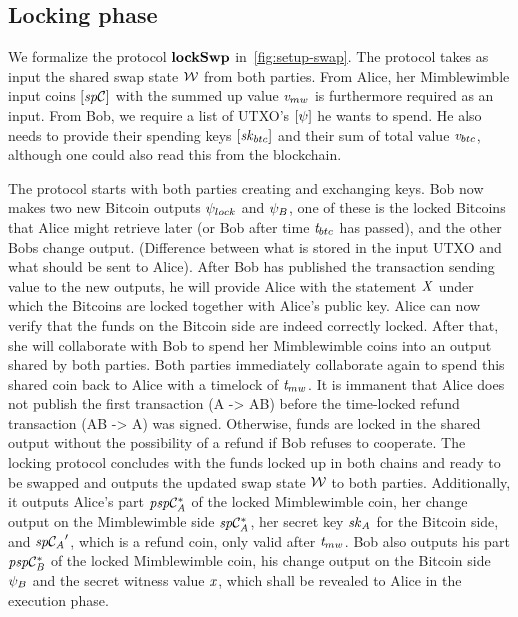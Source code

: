 \subsection{Locking phase}\label{subsec:atom:locking}

We formalize the protocol $\mathbf{lockSwp}$ in~\cref{fig:setup-swap}.
The protocol takes as input the shared swap state $\mathcal{W}$ from both parties.
From Alice, her Mimblewimble input coins $[\mathit{sp}\mathcal{C}]$ with the summed up value $\mathit{v}_{mw}$ is furthermore required as an input.
From Bob, we require a list of UTXO's $[\psi]$ he wants to spend.
He also needs to provide their spending keys $[\mathit{sk}_{btc}]$ and their sum of total value $\mathit{v}_{btc}$, although one could also read this from the blockchain.

The protocol starts with both parties creating and exchanging keys.
Bob now makes two new Bitcoin outputs $\psi_{lock}$ and $\psi_{B}$, one of these is the locked Bitcoins that Alice might retrieve later (or Bob after time $\mathit{t}_{btc}$ has passed), and the other Bobs change output. (Difference between what is stored in the input UTXO and what should be sent to Alice).
After Bob has published the transaction sending value to the new outputs, he will provide Alice with the statement $\mathit{X}$ under which the Bitcoins are locked together with Alice's public key.
Alice can now verify that the funds on the Bitcoin side are indeed correctly locked.
After that, she will collaborate with Bob to spend her Mimblewimble coins into an output shared by both parties.
Both parties immediately collaborate again to spend this shared coin back to Alice with a timelock of $\mathit{t}_{mw}$.
It is immanent that Alice does not publish the first transaction (A -> AB) before the time-locked refund transaction (AB -> A) was signed.
Otherwise, funds are locked in the shared output without the possibility of a refund if Bob refuses to cooperate.
The locking protocol concludes with the funds locked up in both chains and ready to be swapped and outputs the updated swap state $\mathcal{W}$ to both parties.
Additionally, it outputs Alice's part $\mathit{psp}\mathcal{C}_{\mathit{A}}^*$ of the locked Mimblewimble coin, her change output on the Mimblewimble side $\mathit{sp}\mathcal{C}_{\mathit{A}}^*$, her secret key $\mathit{sk}_{\mathit{A}}$ for the Bitcoin side, and ${\mathit{sp}\mathcal{C}_{\mathit{A}}}'$, which is a refund coin, only valid after $\mathit{t}_{mw}$.
Bob also outputs his part $\mathit{psp}\mathcal{C}_{\mathit{B}}^*$ of the locked Mimblewimble coin, his change output on the Bitcoin side $\psi_{B}$ and the secret witness value $\mathit{x}$, which shall be revealed to Alice in the execution phase.

